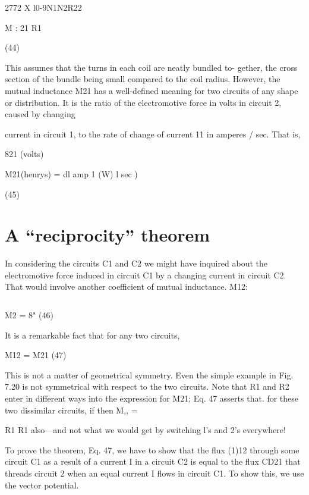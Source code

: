 \begin{equation}
\end{equation}
2772 X l0-9N1N2R22

M :
21 R1

(44)

This assumes that the turns in each coil are neatly bundled to-
gether, the cross section of the bundle being small compared to the
coil radius. However, the mutual inductance M21 has a well-defined
meaning for two circuits of any shape or distribution. It is the ratio
of the electromotive force in volts in circuit 2, caused by changing

current in circuit 1, to the rate of change of current 11 in amperes / sec.
That is,

\begin{equation}
\end{equation}
821 (volts)

M21(henrys) = dl amp
1
(W) l sec )

(45)

\section{A ``reciprocity'' theorem}

In considering the circuits C1 and C2 we might have inquired about
the electromotive force induced in circuit C1 by a changing current
in circuit C2. That would involve another coefficient of mutual
inductance. M12:

\begin{equation}
\end{equation}

M2 = 8" (46)

It is a remarkable fact that for any two circuits,

\begin{equation}
\end{equation}
M12 = M21 (47)

This is not a matter of geometrical symmetry. Even the simple
example in Fig. 7.20 is not symmetrical with respect to the two
circuits. Note that R1 and R2 enter in different ways into the expression
for M21; Eq. 47 asserts that. for these two dissimilar circuits, if
 then M,, = 

R1 R1
also---and not what we would get by switching l's and 2's everywhere!

To prove the theorem, Eq. 47, we have to show that the flux (1)12
through some circuit C1 as a result of a current I in a circuit C2 is
equal to the flux CD21 that threads circuit 2 when an equal current I
flows in circuit C1. To show this, we use the vector potential.

